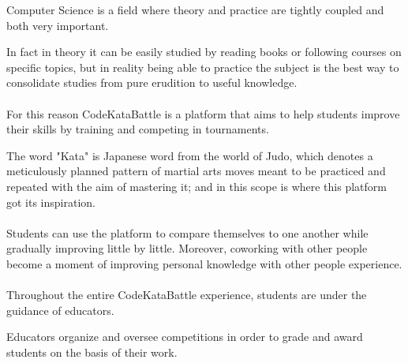 \setlength{\leftmargini}{5em} %
Computer Science is a field where theory and practice are tightly coupled and both very important. 

In fact in theory it can be easily studied by reading books or following courses on specific topics, but in reality being able to practice the subject is the best way to consolidate studies from pure erudition to useful knowledge.\\
\\
For this reason CodeKataBattle is a platform that aims to help students improve their skills by training and competing in tournaments.

The word "Kata" is Japanese word from the world of Judo, which denotes a meticulously planned pattern of martial arts moves meant to be practiced and repeated with the aim of mastering it; and in this scope is where this platform got its inspiration.\\ 
\\
Students can use the platform to compare themselves to one another while gradually improving little by little. Moreover, coworking with other people become a moment of improving personal knowledge with other people experience.\\
\\
Throughout the entire CodeKataBattle experience, students are under the guidance of educators.

Educators organize and oversee competitions in order to grade and award students on the basis of their work.

